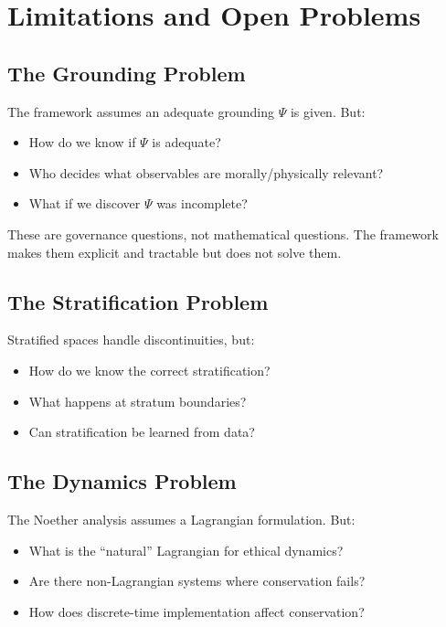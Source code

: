 \documentclass[12pt]{article}
\begin{document}
\section{Limitations and Open Problems}

\subsection{The Grounding Problem}

The framework assumes an adequate grounding $\Psi$ is given. But:

\begin{itemize}
    \item How do we know if $\Psi$ is adequate?
    \item Who decides what observables are morally/physically relevant?
    \item What if we discover $\Psi$ was incomplete?
\end{itemize}

These are governance questions, not mathematical questions. The framework makes them explicit and tractable but does not solve them.

\subsection{The Stratification Problem}

Stratified spaces handle discontinuities, but:

\begin{itemize}
    \item How do we know the correct stratification?
    \item What happens at stratum boundaries?
    \item Can stratification be learned from data?
\end{itemize}

\subsection{The Dynamics Problem}

The Noether analysis assumes a Lagrangian formulation. But:

\begin{itemize}
    \item What is the ``natural'' Lagrangian for ethical dynamics?
    \item Are there non-Lagrangian systems where conservation fails?
    \item How does discrete-time implementation affect conservation?
\end{itemize}
\end{document}
